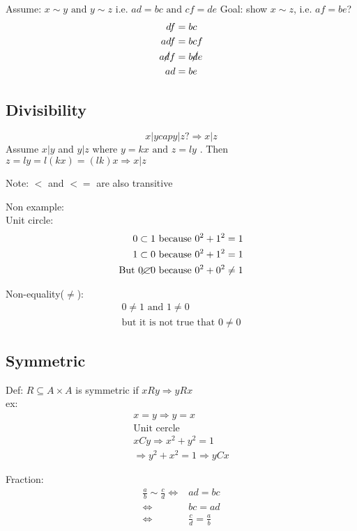 \documentclass{article}
\begin{document}
Assume: $x \sim y \text{ and } y \sim z$ i.e. $ad=bc \text{ and } cf=de$
Goal: show $x \sim z$, i.e. $af=be$?
\begin{align*}
    df           & = bc           \\
    adf          & = bcf          \\
    a\cancel{d}f & = b\cancel{d}e \\
    ad           & = be
\end{align*}

\subsection{Divisibility}
\[
    x|y cap y|z ?\Rightarrow x|z
\]
Assume $x|y$ and $y|z$ where
$y = kx \text{ and } z = ly$
. Then $z=ly=l(kx)=(lk)x \Rightarrow x|z$

Note: $<$ and $<=$ are also transitive

Non example:\\

Unit circle:
\begin{align*}
    0 \subset 1                      & \text{ because } 0 ^{2} + 1 ^{2} = 1    \\
    1 \subset 0                      & \text{ because } 0 ^{2} + 1 ^{2} = 1    \\
    \text{But } 0 \cancel{\subset} 0 & \text{ because } 0 ^{2} + 0 ^{2} \neq 1
\end{align*}

Non-equality($\neq$):
\begin{gather*}
    0 \neq 1 \text{ and } 1 \neq 0 \\
    \text{but it is not true that } 0 \neq 0
\end{gather*}

\subsection{Symmetric}
Def: $R \subseteq A \times A$ is symmetric if $xRy \Rightarrow yRx$\\
ex:
\begin{align*}
    x=y \Rightarrow y=x                 \\
    \text{Unit cercle}                  \\
    xCy \Rightarrow x ^{2} + y ^{2} = 1 \\
    \Rightarrow y^2+x^2 =1 \Rightarrow yCx
\end{align*}

Fraction:
\begin{align*}
    \frac{a}{b} \sim \frac{c}{d} \iff & ad=bc                     \\
    \iff                              & bc=ad                     \\
    \iff                              & \frac{c}{d} = \frac{a}{b}
\end{align*}
\end{document}
